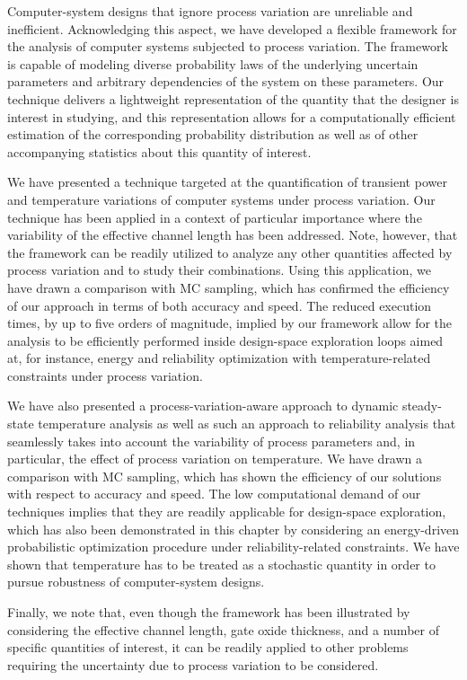 Computer-system designs that ignore process variation are unreliable and
inefficient. Acknowledging this aspect, we have developed a flexible framework
for the analysis of computer systems subjected to process variation. The
framework is capable of modeling diverse probability laws of the underlying
uncertain parameters and arbitrary dependencies of the system on these
parameters. Our technique delivers a lightweight representation of the quantity
that the designer is interest in studying, and this representation allows for a
computationally efficient estimation of the corresponding probability
distribution as well as of other accompanying statistics about this quantity of
interest.

We have presented a technique targeted at the quantification of transient power
and temperature variations of computer systems under process variation. Our
technique has been applied in a context of particular importance where the
variability of the effective channel length has been addressed. Note, however,
that the framework can be readily utilized to analyze any other quantities
affected by process variation and to study their combinations. Using this
application, we have drawn a comparison with \ac{MC} sampling, which has
confirmed the efficiency of our approach in terms of both accuracy and speed.
The reduced execution times, by up to five orders of magnitude, implied by our
framework allow for the analysis to be efficiently performed inside design-space
exploration loops aimed at, for instance, energy and reliability optimization
with temperature-related constraints under process variation.

We have also presented a process-variation-aware approach to dynamic
steady-state temperature analysis as well as such an approach to reliability
analysis that seamlessly takes into account the variability of process
parameters and, in particular, the effect of process variation on temperature.
We have drawn a comparison with \ac{MC} sampling, which has shown the efficiency
of our solutions with respect to accuracy and speed. The low computational
demand of our techniques implies that they are readily applicable for
design-space exploration, which has also been demonstrated in this chapter by
considering an energy-driven probabilistic optimization procedure under
reliability-related constraints. We have shown that temperature has to be
treated as a stochastic quantity in order to pursue robustness of
computer-system designs.

Finally, we note that, even though the framework has been illustrated by
considering the effective channel length, gate oxide thickness, and a number of
specific quantities of interest, it can be readily applied to other problems
requiring the uncertainty due to process variation to be considered.
